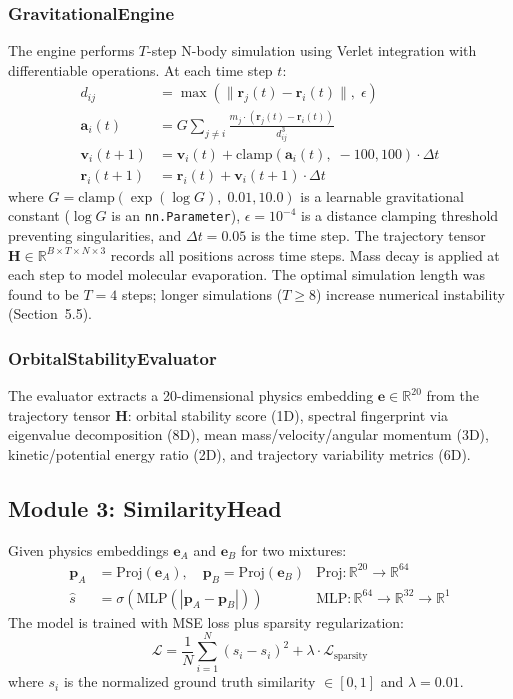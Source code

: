 \documentclass[11pt,a4paper]{article}
\begin{document}
\subsubsection{GravitationalEngine}
The engine performs $T$-step N-body simulation using Verlet integration with differentiable operations. At each time step $t$:
\begin{align}
    d_{ij} &= \max(\|\mathbf{r}_j(t) - \mathbf{r}_i(t)\|,\; \epsilon) \\
    \mathbf{a}_i(t) &= G \sum_{j \neq i} \frac{m_j \cdot (\mathbf{r}_j(t) - \mathbf{r}_i(t))}{d_{ij}^3} \\
    \mathbf{v}_i(t\!+\!1) &= \mathbf{v}_i(t) + \text{clamp}(\mathbf{a}_i(t),\; -100, 100) \cdot \Delta t \\
    \mathbf{r}_i(t\!+\!1) &= \mathbf{r}_i(t) + \mathbf{v}_i(t\!+\!1) \cdot \Delta t
\end{align}
where $G = \text{clamp}(\exp(\log G),\; 0.01, 10.0)$ is a learnable gravitational constant ($\log G$ is an \texttt{nn.Parameter}), $\epsilon = 10^{-4}$ is a distance clamping threshold preventing singularities, and $\Delta t = 0.05$ is the time step. The trajectory tensor $\mathbf{H} \in \mathbb{R}^{B \times T \times N \times 3}$ records all positions across time steps. Mass decay is applied at each step to model molecular evaporation. The optimal simulation length was found to be $T = 4$ steps; longer simulations ($T \geq 8$) increase numerical instability (Section~5.5).

\subsubsection{OrbitalStabilityEvaluator}
The evaluator extracts a 20-dimensional physics embedding $\mathbf{e} \in \mathbb{R}^{20}$ from the trajectory tensor $\mathbf{H}$: orbital stability score (1D), spectral fingerprint via eigenvalue decomposition (8D), mean mass/velocity/angular momentum (3D), kinetic/potential energy ratio (2D), and trajectory variability metrics (6D).

\subsection{Module 3: SimilarityHead}
Given physics embeddings $\mathbf{e}_A$ and $\mathbf{e}_B$ for two mixtures:
\begin{align}
    \mathbf{p}_A &= \text{Proj}(\mathbf{e}_A), \quad \mathbf{p}_B = \text{Proj}(\mathbf{e}_B) & \text{Proj}: \mathbb{R}^{20} \to \mathbb{R}^{64} \\
    \hat{s} &= \sigma(\text{MLP}(|\mathbf{p}_A - \mathbf{p}_B|)) & \text{MLP}: \mathbb{R}^{64} \to \mathbb{R}^{32} \to \mathbb{R}^{1}
\end{align}
The model is trained with MSE loss plus sparsity regularization:
\begin{equation}
    \mathcal{L} = \frac{1}{N} \sum_{i=1}^{N} (\hat{s}_i - s_i)^2 + \lambda \cdot \mathcal{L}_{\text{sparsity}}
\end{equation}
where $s_i$ is the normalized ground truth similarity $\in [0, 1]$ and $\lambda = 0.01$.
\end{document}

